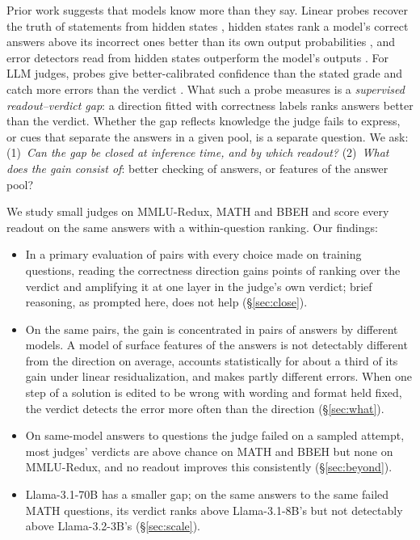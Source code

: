 \documentclass[11pt]{article}
\begin{document}
Prior work suggests that models know more than they say. Linear probes recover the truth of statements from hidden states \citep{azaria-mitchell-2023-internal,marks2024geometry}, hidden states rank a model's correct answers above its incorrect ones better than its own output probabilities \citep{gekhman2025insideout}, and error detectors read from hidden states outperform the model's outputs \citep{orgad2025llms}. For LLM judges, probes give better-calibrated confidence than the stated grade \citep{radharapu-etal-2026-calibrating} and catch more errors than the verdict \citep{gulati2026auditing}. What such a probe measures is a \emph{supervised readout--verdict gap}: a direction fitted with correctness labels ranks answers better than the verdict. Whether the gap reflects knowledge the judge fails to express, or cues that separate the answers in a given pool, is a separate question. We ask:
(1)~\emph{Can the gap be closed at inference time, and by which readout?}
(2)~\emph{What does the gain consist of}: better checking of answers, or features of the answer pool?

We study small judges on MMLU-Redux, MATH and BBEH and score every readout on the same answers with a within-question ranking. Our findings:
\begin{itemize}\setlength\itemsep{1pt}
\item In a primary evaluation of  pairs with every choice made on training questions, reading the correctness direction gains  points of ranking over the verdict and amplifying it at one layer  in the judge's own verdict; brief reasoning, as prompted here, does not help (\S\ref{sec:close}).
\item On the same pairs, the gain is concentrated in pairs of answers by different models. A model of surface features of the answers is not detectably different from the direction on average, accounts statistically for about a third of its gain under linear residualization, and makes partly different errors. When one step of a solution is edited to be wrong with wording and format held fixed, the verdict detects the error more often than the direction (\S\ref{sec:what}).
\item On same-model answers to questions the judge failed on a sampled attempt, most judges' verdicts are above chance on MATH and BBEH but none on MMLU-Redux, and no readout improves this consistently (\S\ref{sec:beyond}).
\item Llama-3.1-70B has a smaller gap; on the same answers to the same failed MATH questions, its verdict ranks above Llama-3.1-8B's but not detectably above Llama-3.2-3B's (\S\ref{sec:scale}).
\end{itemize}
\end{document}
